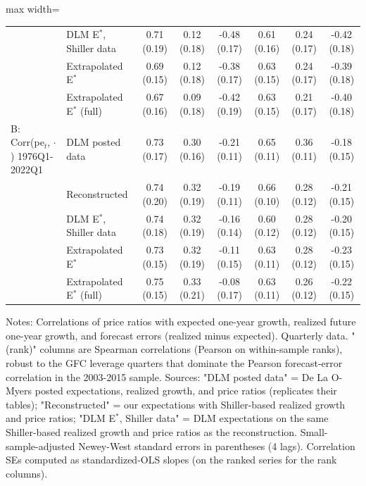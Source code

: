 \documentclass[11pt]{article}
\begin{document}
\begin{table}[H]
\begin{adjustbox}{max width=\textwidth}
\begin{tabular}{llcccccc}
 & DLM E$^*$, Shiller data & 0.71 (0.19) & 0.12 (0.18) & -0.48 (0.17) & 0.61 (0.16) & 0.24 (0.17) & -0.42 (0.18) \\
 & Extrapolated E$^*$ & 0.69 (0.15) & 0.12 (0.18) & -0.38 (0.17) & 0.63 (0.15) & 0.24 (0.17) & -0.39 (0.18) \\
 & Extrapolated E$^*$ (full) & 0.67 (0.16) & 0.09 (0.18) & -0.42 (0.19) & 0.63 (0.15) & 0.21 (0.17) & -0.40 (0.18) \\
\addlinespace
B: Corr(pe$_t$, $\cdot$)  1976Q1-2022Q1 & DLM posted data & 0.73 (0.17) & 0.30 (0.16) & -0.21 (0.11) & 0.65 (0.11) & 0.36 (0.11) & -0.18 (0.15) \\
 & Reconstructed & 0.74 (0.20) & 0.32 (0.19) & -0.19 (0.11) & 0.66 (0.10) & 0.28 (0.12) & -0.21 (0.15) \\
 & DLM E$^*$, Shiller data & 0.74 (0.18) & 0.32 (0.19) & -0.16 (0.14) & 0.60 (0.12) & 0.28 (0.12) & -0.20 (0.15) \\
 & Extrapolated E$^*$ & 0.73 (0.15) & 0.32 (0.19) & -0.11 (0.15) & 0.63 (0.11) & 0.28 (0.12) & -0.23 (0.15) \\
 & Extrapolated E$^*$ (full) & 0.75 (0.15) & 0.33 (0.21) & -0.08 (0.17) & 0.63 (0.11) & 0.26 (0.12) & -0.22 (0.15) \\
\bottomrule
\end{tabular}
\end{adjustbox}

\vspace{2pt}
{\footnotesize Notes: Correlations of price ratios with expected one-year growth, realized future one-year growth, and forecast errors (realized minus expected). Quarterly data. "(rank)" columns are Spearman correlations (Pearson on within-sample ranks), robust to the GFC leverage quarters that dominate the Pearson forecast-error correlation in the 2003-2015 sample. Sources: "DLM posted data" = De La O-Myers posted expectations, realized growth, and price ratios (replicates their tables); "Reconstructed" = our expectations with Shiller-based realized growth and price ratios; "DLM E$^*$, Shiller data" = DLM expectations on the same Shiller-based realized growth and price ratios as the reconstruction. Small-sample-adjusted Newey-West standard errors in parentheses (4 lags). Correlation SEs computed as standardized-OLS slopes (on the ranked series for the rank columns).}
\end{table}
\end{document}
